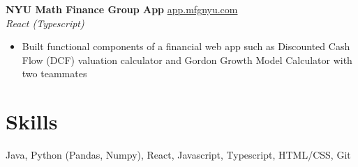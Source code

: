 \documentclass[margin]{res}
\begin{document}
\begin{resume}
{\bf NYU Math Finance Group App} \hfill\href{https://github.com/mfg-nyu/app}{app.mfgnyu.com}\\
{\it React (Typescript)}
\begin{itemize} \itemsep -2pt
\item Built functional components of a financial web app such as Discounted Cash Flow (DCF) valuation calculator and Gordon Growth Model Calculator with two teammates
\end{itemize}


\section{Skills} 
Java, Python (Pandas, Numpy), React, Javascript, Typescript, HTML/CSS, Git


\end{resume} 
\end{document}
